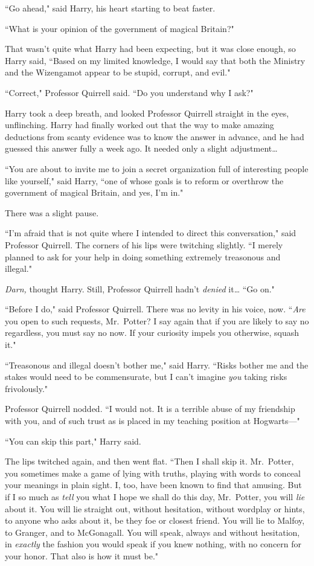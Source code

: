 ``Go ahead," said Harry, his heart starting to beat faster.

``What is your opinion of the government of magical Britain?"

That wasn't quite what Harry had been expecting, but it was close enough, so Harry said, ``Based on my limited knowledge, I would say that both the Ministry and the Wizengamot appear to be stupid, corrupt, and evil."

``Correct," Professor Quirrell said. ``Do you understand why I ask?"

Harry took a deep breath, and looked Professor Quirrell straight in the eyes, unflinching. Harry had finally worked out that the way to make amazing deductions from scanty evidence was to know the answer in advance, and he had guessed this answer fully a week ago. It needed only a slight adjustment{\ldots}

``You are about to invite me to join a secret organization full of interesting people like yourself," said Harry, ``one of whose goals is to reform or overthrow the government of magical Britain, and yes, I'm in."

There was a slight pause.

``I'm afraid that is not quite where I intended to direct this conversation," said Professor Quirrell. The corners of his lips were twitching slightly. ``I merely planned to ask for your help in doing something extremely treasonous and illegal."

\emph{Darn,} thought Harry. Still, Professor Quirrell hadn't \emph{denied} it{\ldots} ``Go on."

``Before I do," said Professor Quirrell. There was no levity in his voice, now. ``\emph{Are} you open to such requests, Mr.~Potter? I say again that if you are likely to say no regardless, you must say no now. If your curiosity impels you otherwise, squash it."

``Treasonous and illegal doesn't bother me," said Harry. ``Risks bother me and the stakes would need to be commensurate, but I can't imagine \emph{you} taking risks frivolously."

Professor Quirrell nodded. ``I would not. It is a terrible abuse of my friendship with you, and of such trust as is placed in my teaching position at Hogwarts—"

``You can skip this part," Harry said.

The lips twitched again, and then went flat. ``Then I shall skip it. Mr.~Potter, you sometimes make a game of lying with truths, playing with words to conceal your meanings in plain sight. I, too, have been known to find that amusing. But if I so much as \emph{tell} you what I hope we shall do this day, Mr.~Potter, you will \emph{lie} about it. You will lie straight out, without hesitation, without wordplay or hints, to anyone who asks about it, be they foe or closest friend. You will lie to Malfoy, to Granger, and to McGonagall. You will speak, always and without hesitation, in \emph{exactly} the fashion you would speak if you knew nothing, with no concern for your honor. That also is how it must be."

